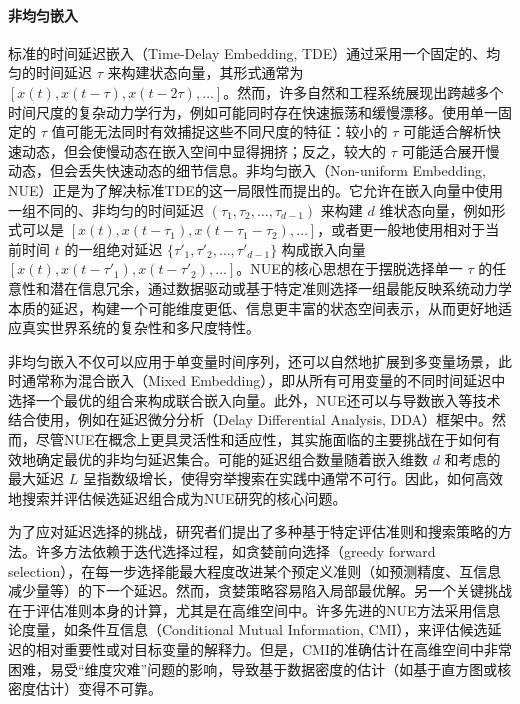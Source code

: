 \paragraph{非均匀嵌入} %
标准的时间延迟嵌入（Time-Delay Embedding, TDE）通过采用一个固定的、均匀的时间延迟 $\tau$ 来构建状态向量，其形式通常为 $[x(t), x(t-\tau), x(t-2\tau), \dots]$。然而，许多自然和工程系统展现出跨越多个时间尺度的复杂动力学行为，例如可能同时存在快速振荡和缓慢漂移。使用单一固定的 $\tau$ 值可能无法同时有效捕捉这些不同尺度的特征：较小的 $\tau$ 可能适合解析快速动态，但会使慢动态在嵌入空间中显得拥挤；反之，较大的 $\tau$ 可能适合展开慢动态，但会丢失快速动态的细节信息。非均匀嵌入（Non-uniform Embedding, NUE）\cite{jia2019detecting}正是为了解决标准TDE的这一局限性而提出的。它允许在嵌入向量中使用一组不同的、非均匀的时间延迟 $(\tau_1, \tau_2, \dots, \tau_{d-1})$ 来构建 $d$ 维状态向量，例如形式可以是 $[x(t), x(t-\tau_1), x(t-\tau_1-\tau_2), \dots]$，或者更一般地使用相对于当前时间 $t$ 的一组绝对延迟 $\{\tau'_1, \tau'_2, \dots, \tau'_{d-1}\}$ 构成嵌入向量 $[x(t), x(t-\tau'_1), x(t-\tau'_2), \dots]$。NUE的核心思想在于摆脱选择单一 $\tau$ 的任意性和潜在信息冗余，通过数据驱动或基于特定准则选择一组最能反映系统动力学本质的延迟，构建一个可能维度更低、信息更丰富的状态空间表示，从而更好地适应真实世界系统的复杂性和多尺度特性。

非均匀嵌入不仅可以应用于单变量时间序列，还可以自然地扩展到多变量场景，此时通常称为混合嵌入（Mixed Embedding），即从所有可用变量的不同时间延迟中选择一个最优的组合来构成联合嵌入向量。此外，NUE还可以与导数嵌入等技术结合使用，例如在延迟微分分析（Delay Differential Analysis, DDA）框架中。然而，尽管NUE在概念上更具灵活性和适应性，其实施面临的主要挑战在于如何有效地确定最优的非均匀延迟集合。可能的延迟组合数量随着嵌入维数 $d$ 和考虑的最大延迟 $L$ 呈指数级增长，使得穷举搜索在实践中通常不可行。因此，如何高效地搜索并评估候选延迟组合成为NUE研究的核心问题。

为了应对延迟选择的挑战，研究者们提出了多种基于特定评估准则和搜索策略的方法。许多方法依赖于迭代选择过程，如贪婪前向选择（greedy forward selection），在每一步选择能最大程度改进某个预定义准则（如预测精度、互信息减少量等）的下一个延迟。然而，贪婪策略容易陷入局部最优解。另一个关键挑战在于评估准则本身的计算，尤其是在高维空间中。许多先进的NUE方法采用信息论度量，如条件互信息（Conditional Mutual Information, CMI）\cite{jia2020refined}，来评估候选延迟的相对重要性或对目标变量的解释力。但是，CMI的准确估计在高维空间中非常困难，易受“维度灾难”问题的影响，导致基于数据密度的估计（如基于直方图或核密度估计）变得不可靠。

